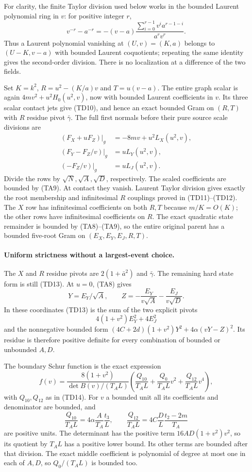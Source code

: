 For clarity, the finite Taylor division used below works in the
bounded Laurent polynomial ring in $v$: for positive integer $r$,
\[
 v^{-r}-a^{-r}
 =-(v-a)\frac{\sum_{i=0}^{r-1}v^i a^{r-1-i}}{a^rv^r}.
\]
Thus a Laurent polynomial vanishing at $(U,v)=(K,a)$ belongs to
$(U-K,v-a)$ with bounded Laurent coquotients; repeating the same
identity gives the second-order division. There is no localization
at a difference of the two fields.

Set $K=k^2$, $R=u^2-(K/a)v$ and $T=u(v-a)$. The entire graph
scalar is again $4mv^2+u^2H_0(u^2,v)$, now with bounded Laurent
coefficients in $v$. Its three scalar contact jets give (TD10),
and hence an exact bounded Gram on $(R,T)$ with $R$ residue pivot
$\bar\gamma$. The full first normals before their pure source
scale divisions are
\[
\begin{split}
 (F_X+uF_Z)|_g&=-8mv+u^2L_X(u^2,v),\\
 (F_Y-F_Z/v)|_g&=uL_Y(u^2,v),\\
 (-F_Z/v)|_g&=uL_J(u^2,v).                                     \end{split} \tag{TA10}
\]
Divide the rows by $\sqrt N,\sqrt A,\sqrt D$, respectively.
The scaled coefficients are bounded by (TA9). At contact they
vanish. Laurent Taylor division gives exactly the root membership
and infinitesimal $R$ couplings proved in (TD11)--(TD12).
The $X$ row has infinitesimal coefficients on both $R,T$ because
$m/K=O(K)$; the other rows have infinitesimal coefficients on $R$.
The exact quadratic state remainder is bounded by (TA8)--(TA9),
so the entire original parent has a bounded five-root Gram on
$(E_X,E_Y,E_J,R,T)$.

\paragraph{Uniform strictness without a largest-event choice.}
The $X$ and $R$ residue pivots are $2(1+\bar a^2)$ and
$\bar\gamma$. The remaining hard state form is still (TD13).
At $u=0$, (TA8) gives
\[
 Y=E_Y/\sqrt A,\qquad
 Z=-\frac{E_Y}{v\sqrt A}-\frac{E_J}{v\sqrt D}.
\]
In these coordinates (TD13) is the sum of the two explicit pivots
\[
 4(1+v^2)E_Y^2+4E_J^2
\]
and the nonnegative bounded form
$(4C+2d)(1+v^2)Y^2+4\alpha(vY-Z)^2$.
Its residue is therefore positive definite for every combination of
bounded or unbounded $A,D$.

The boundary Schur function is the exact expression
\[
 f(v)=\frac{8(1+v^2)}{\det B(v)/(T_A L)}
 \left(\frac{Q_{10}}{T_A L}+
       \frac{Q_0}{T_A L}v^2+\frac{Q_{12}}{T_A L}v^4\right),     \tag{TA11}
\]
with $Q_{10},Q_{12}$ as in (TD14). For $v$ a bounded unit all its
coefficients and denominator are bounded, and
\[
 \frac{Q_{10}}{T_A L}=4\alpha\frac A{T_A}\frac{t_3}{L},\qquad
 \frac{Q_{12}}{T_A L}=4C\frac D L\frac{t_2-2m}{T_A}
\]
are positive units. The determinant has the positive term
$16AD(1+v^2)v^2$, so its quotient by $T_A L$ has a positive lower
bound. Its other terms are bounded after that division.
The exact middle coefficient is polynomial of degree at most one
in each of $A,D$, so $Q_0/(T_A L)$ is bounded too.


